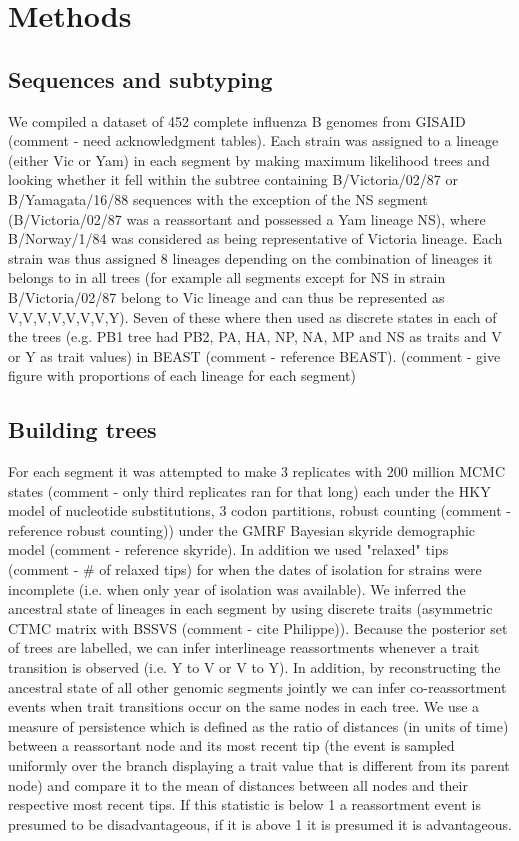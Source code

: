 \documentclass[11pt,oneside,letterpaper]{article}
\begin{document}
\section*{Methods}

\subsection*{Sequences and subtyping}
We compiled a dataset of 452 complete influenza B genomes from GISAID (comment - need acknowledgment tables). 
Each strain was assigned to a lineage (either Vic or Yam) in each segment by making maximum likelihood trees and looking whether it fell within the subtree containing B/Victoria/02/87 or B/Yamagata/16/88 sequences with the exception of the NS segment (B/Victoria/02/87 was a reassortant and possessed a Yam lineage NS), where B/Norway/1/84 was considered as being representative of Victoria lineage.
Each strain was thus assigned 8 lineages depending on the combination of lineages it belongs to in all trees (for example all segments except for NS in strain B/Victoria/02/87 belong to Vic lineage and can thus be represented as V,V,V,V,V,V,V,Y). 
Seven of these where then used as discrete states in each of the trees (e.g. PB1 tree had PB2, PA, HA, NP, NA, MP and NS as traits and V or Y as trait values) in BEAST (comment - reference BEAST). (comment - give figure with proportions of each lineage for each segment)

\subsection*{Building trees}
For each segment it was attempted to make 3 replicates with 200 million MCMC states (comment - only third replicates ran for that long) each under the HKY model of nucleotide substitutions, 3 codon partitions, robust counting (comment - reference robust counting)) under the GMRF Bayesian skyride demographic model (comment - reference skyride).
In addition we used "relaxed" tips (comment - \# of relaxed tips) for when the dates of isolation for strains were incomplete (i.e. when only year of isolation was available).
We inferred the ancestral state of lineages in each segment by using discrete traits (asymmetric CTMC matrix with BSSVS (comment - cite Philippe)). Because the posterior set of trees are labelled, we can infer interlineage reassortments whenever a trait transition is observed (i.e. Y to V or V to Y). 
In addition, by reconstructing the ancestral state of all other genomic segments jointly we can infer co-reassortment events when trait transitions occur on the same nodes in each tree.
We use a measure of persistence which is defined as the ratio of distances (in units of time) between a reassortant node and its most recent tip (the event is sampled uniformly over the branch displaying a trait value that is different from its parent node) and compare it to the mean of distances between all nodes and their respective most recent tips. 
If this statistic is below 1 a reassortment event is presumed to be disadvantageous, if it is above 1 it is presumed it is advantageous.
\end{document}
